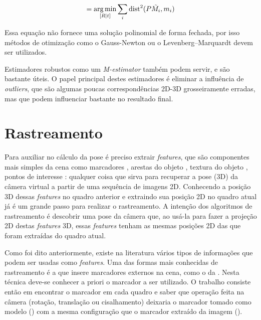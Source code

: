 \begin{equation}
[R | t] = \argmin_{[R | t]} \sum_i \text{dist}^2(P\tilde{M_i}, m_i)
\end{equation}

Essa equação não fornece uma solução polinomial de forma fechada, por isso métodos de otimização como o Gauss-Newton ou o Levenberg–Marquardt devem ser utilizados.

Estimadores robustos como um \emph{M-estimator} também podem servir, e são bastante úteis. O papel principal destes estimadores é eliminar a influência de \emph{outliers}, que são algumas poucas correspondências 2D-3D grosseiramente erradas, mas que podem influenciar bastante no resultado final.

\section{Rastreamento}

Para auxiliar no cálculo da pose é preciso extrair \emph{features}, que são componentes mais simples da cena como marcadores \cite{ref_marcadores}, arestas do objeto \cite{ref_arestas}, textura do objeto \cite{ref_textura}, pontos de interesse \cite{ref_pontosdeinteresse}: qualquer coisa que sirva para recuperar a pose (3D) da câmera virtual a partir de uma sequência de imagens 2D. Conhecendo a posição 3D dessas \emph{features} no quadro anterior e extraindo sua posição 2D no quadro atual já é um grande passo para realizar o rastreamento. A intenção dos algoritmos de rastreamento é descobrir uma pose da câmera que, ao usá-la para fazer a projeção 2D destas \emph{features} 3D, essas \emph{features} tenham as mesmas posições 2D das que foram extraídas do quadro atual.

Como foi dito anteriormente, existe na literatura vários tipos de informações que podem ser usadas como \emph{features}. Uma das formas mais conhecidas de rastreamento é a que insere marcadores externos na cena, como o da . Nesta técnica deve-se conhecer a priori o marcador a ser utilizado. O trabalho consiste então em encontrar o marcador em cada quadro e saber que operação feita na câmera (rotação, translação ou cisalhamento) deixaria o marcador tomado como modelo () com a mesma configuração que o marcador extraído da imagem ().

